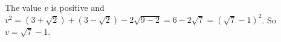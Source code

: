 The value $v$ is positive and $v^2=(3+\sqrt2)+(3-\sqrt2)-2\sqrt{9-2}=6-2\sqrt7=(\sqrt7-1)^2$. So $v=\boxed{\sqrt7-1}$.
